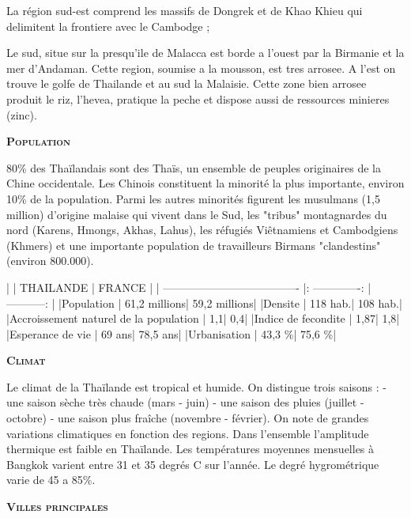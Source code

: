 \begin{multicols}{2}
La région sud-est comprend les massifs de Dongrek et de Khao Khieu qui delimitent la frontiere avec le Cambodge ;

Le sud, situe sur la presqu’ile de Malacca est borde a l’ouest par la Birmanie et la mer d’Andaman. Cette region, soumise a la mousson, est tres arrosee. A l’est on trouve le golfe de Thailande et au sud la Malaisie. Cette zone bien arrosee produit le riz, l’hevea, pratique la peche et dispose aussi de ressources minieres (zinc).

\textbf{\textsc{Population}}

80\% des Thaïlandais sont des Thaïs, un ensemble de peuples originaires de la Chine occidentale. Les Chinois constituent la minorité la plus importante, environ 10\% de la population. Parmi les autres minorités figurent les musulmans (1,5 million) d’origine malaise qui vivent dans le Sud, les "tribus" montagnardes du nord (Karens, Hmongs, Akhas, Lahus), les réfugiés Viêtnamiens et Cambodgiens (Khmers) et une importante population de travailleurs Birmans "clandestins" (environ 800.000).

|                                       |     THAILANDE   |    FRANCE    |
| ------------------------------------- |: -------------: | -----------: |
|Population                             |    61,2 millions| 59,2 millions|
|Densite                                |      118 hab.\kilo\meter\squared|   108 hab.\kilo\meter\squared|
|Accroissement naturel de la population |              1,1|           0,4|
|Indice de fecondite                    |             1,87|           1,8|
|Esperance de vie                       |           69 ans|      78,5 ans|
|Urbanisation                           |           43,3 \%|        75,6 \%|

\textbf{\textsc{Climat}}

Le climat de la Thaïlande est tropical et humide. On distingue trois saisons :
- une saison sèche très chaude (mars - juin)
- une saison des pluies (juillet - octobre)
- une saison plus fraîche (novembre - février).
On note de grandes variations climatiques en fonction des regions. Dans l’ensemble l’amplitude thermique est faible en Thaïlande. Les températures moyennes mensuelles à Bangkok varient entre 31 et 35 degrés C sur l’année. Le degré hygrométrique varie de 45 a 85\%.

\textbf{\textsc{Villes principales}}


\end{multicols}
